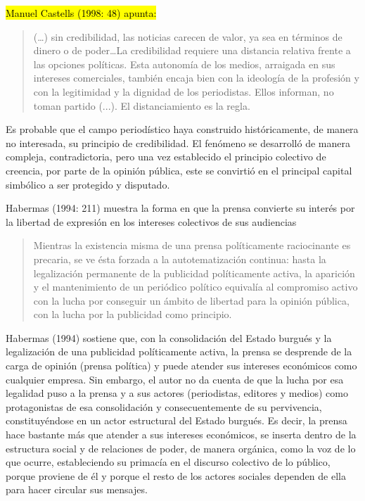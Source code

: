 {%
%
%

\hl{Manuel Castells (1998: 48) apunta:}

\begin{quote}
(\ldots) sin credibilidad, las noticias carecen de valor, ya sea en términos de dinero o de poder\ldots La credibilidad requiere una distancia relativa frente a las opciones políticas. Esta autonomía de los medios, arraigada en sus intereses comerciales, también encaja bien con la ideología de la profesión y con la legitimidad y la dignidad de los periodistas. Ellos informan, no toman partido (...). El distanciamiento es la regla.
\end{quote}

Es probable que el campo periodístico haya construido históricamente, de manera no interesada, su principio de credibilidad. El fenómeno se desarrolló de manera compleja, contradictoria, pero una vez establecido el principio colectivo de creencia, por parte de la opinión pública, este se convirtió en el principal capital simbólico a ser protegido y disputado.

Habermas (1994: 211) muestra la forma en que la prensa convierte su interés por la libertad de expresión en los intereses colectivos de sus audiencias

\begin{quote}
Mientras la existencia misma de una prensa políticamente raciocinante es precaria, se ve ésta forzada a la autotematización continua: hasta la legalización permanente de la publicidad políticamente activa, la aparición y el mantenimiento de un periódico político equivalía al compromiso activo con la lucha por conseguir un ámbito de libertad para la opinión pública, con la lucha por la publicidad como principio.
\end{quote}

Habermas (1994) sostiene que, con la consolidación del Estado burgués y la legalización de una publicidad políticamente activa, la prensa se desprende de la carga de opinión (prensa política) y puede atender sus intereses económicos como cualquier empresa. Sin embargo, el autor no da cuenta de que la lucha por esa legalidad puso a la prensa y a sus actores (periodistas, editores y medios) como protagonistas de esa consolidación y consecuentemente de su pervivencia, constituyéndose en un actor estructural del Estado burgués. Es decir, la prensa hace bastante más que atender a sus intereses económicos, se inserta dentro de la estructura social y de relaciones de poder, de manera orgánica, como la voz de lo que ocurre, estableciendo su primacía en el discurso colectivo de lo público, porque proviene de él y porque el resto de los actores sociales dependen de ella para hacer circular sus mensajes.

}

